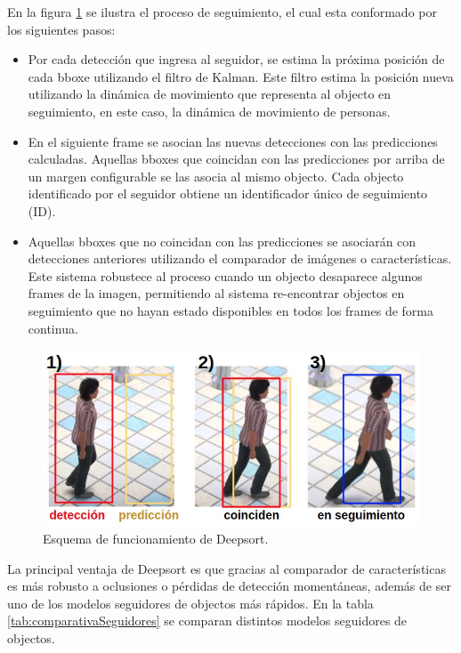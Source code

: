 En la figura \ref{fig:deepsortProcess} se ilustra el proceso de seguimiento, el cual esta conformado por los siguientes pasos:
\begin{itemize}
\item Por cada detección que ingresa al seguidor, se estima la próxima posición de cada bboxe utilizando el filtro de Kalman. Este filtro estima la posición nueva utilizando la dinámica de movimiento que representa al objecto en seguimiento, en este caso, la dinámica de movimiento de personas.
\item En el siguiente frame se asocian las nuevas detecciones con las predicciones calculadas. Aquellas bboxes que coincidan con las predicciones por arriba de un margen configurable se las asocia al mismo objecto. Cada objecto identificado por el seguidor obtiene un identificador único de seguimiento (ID).
\item Aquellas bboxes que no coincidan con las predicciones se asociarán con detecciones anteriores utilizando el comparador de imágenes o características. Este sistema robustece al proceso cuando un objecto desaparece algunos frames de la imagen, permitiendo al sistema re-encontrar objectos en seguimiento que no hayan estado disponibles en todos los frames de forma continua.
\end{itemize}

\begin{figure}[ht]
	\centering
	\includegraphics[scale=.65]{./Figures/deepsortProcess.jpg}
	\caption{Esquema de funcionamiento de Deepsort.}
	\label{fig:deepsortProcess}
\end{figure}

La principal ventaja de Deepsort es que gracias al comparador de características es más robusto a oclusiones o pérdidas de detección momentáneas, además de ser uno de los modelos seguidores de objectos más rápidos. En la tabla \ref{tab:comparativaSeguidores} se comparan distintos modelos seguidores de objectos.

